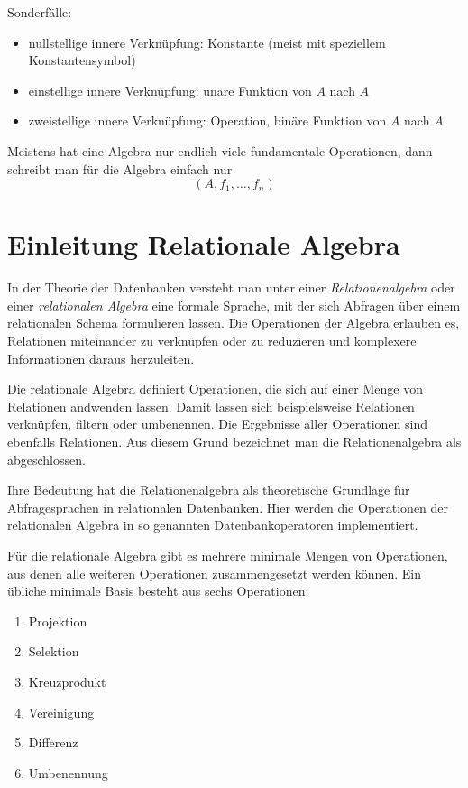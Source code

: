 \documentclass{scrbook}
\begin{document}
\noindent
Sonderfälle:
\begin{itemize}
\item nullstellige innere Verknüpfung: Konstante (meist mit speziellem Konstantensymbol)
\item einstellige innere Verknüpfung: unäre Funktion von $A$ nach $A$
\item zweistellige innere Verknüpfung: Operation, binäre Funktion von $A$ nach $A$
\end{itemize}

\noindent
Meistens hat eine Algebra nur endlich viele fundamentale Operationen,
dann schreibt man für die Algebra einfach nur
\begin{displaymath} 
(A, f_1, \dots, f_n)
\end{displaymath}


\section{Einleitung Relationale Algebra}

In der Theorie der Datenbanken versteht man unter einer
\emph{Relationenalgebra} oder einer \emph{relationalen Algebra} eine formale Sprache,
mit der sich Abfragen über einem relationalen Schema formulieren lassen.
Die Operationen der Algebra erlauben es, Relationen miteinander zu verknüpfen 
oder zu reduzieren und komplexere Informationen daraus herzuleiten.

Die relationale Algebra definiert Operationen, die sich auf einer Menge von Relationen
andwenden lassen.
Damit lassen sich beispielsweise Relationen verknüpfen, filtern oder umbenennen.
Die Ergebnisse aller Operationen sind ebenfalls Relationen.
Aus diesem Grund bezeichnet man die Relationenalgebra als 
abgeschlossen. %

Ihre Bedeutung hat die Relationenalgebra als theoretische Grundlage für 
Abfragesprachen in relationalen Datenbanken.
Hier werden die Operationen der relationalen Algebra in so genannten 
Datenbankoperatoren implementiert.

Für die relationale Algebra gibt es mehrere minimale Mengen von Operationen,
aus denen alle weiteren Operationen zusammengesetzt werden können.
Ein übliche minimale Basis besteht aus sechs Operationen:
\begin{enumerate}
\item Projektion
\item Selektion
\item Kreuzprodukt
\item Vereinigung
\item Differenz
\item Umbenennung
\end{enumerate}
\end{document}
